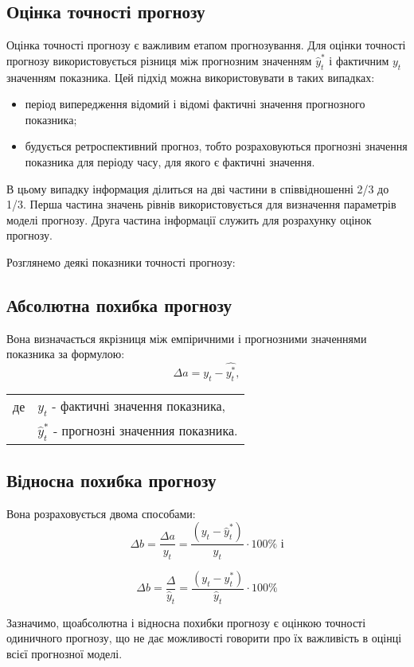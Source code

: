 \documentclass[a4paper, fontsize=10pt, oneside]{article}
\begin{document}
\begin{center}
\chapter{\Large \bf Оцінка точності прогнозу}
\end{center}

Оцінка точності прогнозу є важливим етапом прогнозування. Для  оцінки точності прогнозу використовується різниця між прогнозним значенням $\hat{y}^{*}_{t}$ і фактичним $y_{t}$ значенням показника. Цей підхід можна  використовувати в таких випадках:
\begin{itemize}
\item період випередження відомий і відомі фактичні значення прогнозного показника;
\item будується ретроспективний прогноз, тобто розраховуються прогнозні значення показника для періоду часу, для якого є фактичні значення.
\end{itemize}
В цьому випадку інформация ділиться на дві частини в співвідношенні 2/3 до 1/3. Перша частина значень рівнів використовується для визначення параметрів моделі прогнозу. Друга частина інформації служить для розрахунку оцінок прогнозу.

Розглянемо деякі показники точності прогнозу:
\section{Абсолютна похибка прогнозу}
Вона визначається якрізниця між емпіричними і прогнозними значеннями показника за формулою:
$$\Delta a = y_{t} - \hat{y_{t}^{*}},$$
\begin{tabular}{l l}
де & $y_{t}$ - фактичні значення показника,\\
& $\hat{y}_{t}^{*}$ - прогнозні значенния показника.\\
\end{tabular} 
\section{Відносна похибка прогнозу}
Вона розраховується двома способами:
$$\Delta b = \frac{\Delta a}{y_{t}} = \frac{(y_{t} - \hat{y}_{t}^{*})}{y_{t}} \cdot 100\% \texttt{ і}$$

$$\Delta b = \frac{\Delta }{\hat{y}_{t}} = \frac{(y_{t} - y_{t}^{*})}{\hat{y}_{t}} \cdot 100\% $$

Зазначимо, щоабсолютна і відносна похибки прогнозу є оцінкою точності одиничного прогнозу, що не дає можливості говорити про їх важливість в оцінці всієї прогнозної моделі.
\end{document}
